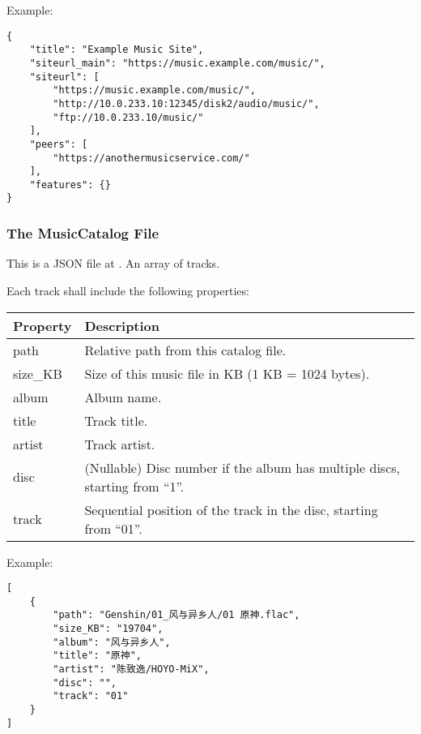 \documentclass[a4paper,11pt]{article}
\begin{document}
Example:

\begin{lstlisting}
{
    "title": "Example Music Site",
    "siteurl_main": "https://music.example.com/music/",
    "siteurl": [
        "https://music.example.com/music/",
        "http://10.0.233.10:12345/disk2/audio/music/",
        "ftp://10.0.233.10/music/"
    ],
    "peers": [
        "https://anothermusicservice.com/"
    ],
    "features": {}
}
\end{lstlisting}

\subsubsection{The MusicCatalog File}

This is a JSON file at . An array of tracks.

Each track shall include the following properties:

\begin{tabu}{|l|X|}
	\hline
	{Property} & {Description}                                                                  \\
	\hline
	{path}     & {Relative path from this catalog file.}                                        \\
	{size\_KB} & {Size of this music file in KB (1 KB = 1024 bytes).}                           \\
	{album}    & {Album name.}                                                                  \\
	{title}    & {Track title.}                                                                 \\
	{artist}   & {Track artist.}                                                                \\
	{disc}     & {(Nullable) Disc number if the album has multiple discs, starting from ``1''.} \\
	{track}    & {Sequential position of the track in the disc, starting from ``01''.}          \\
	\hline
\end{tabu}

Example:

\begin{lstlisting}
[
    {
        "path": "Genshin/01_风与异乡人/01 原神.flac",
        "size_KB": "19704",
        "album": "风与异乡人",
        "title": "原神",
        "artist": "陈致逸/HOYO-MiX",
        "disc": "",
        "track": "01"
    }
]
\end{lstlisting}
\end{document}
